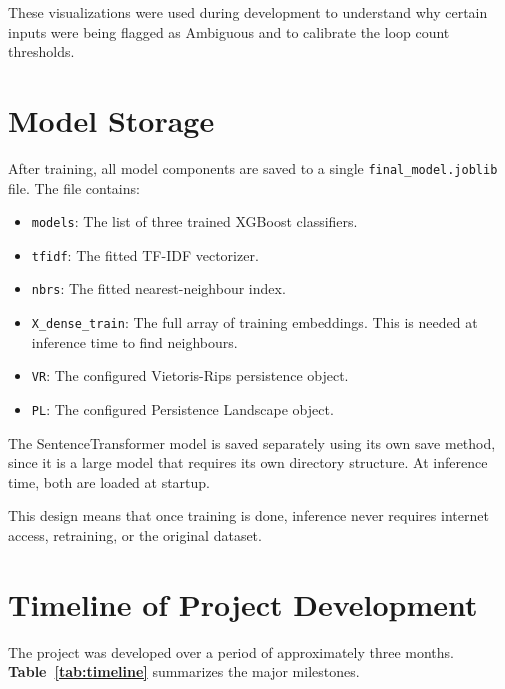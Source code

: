These visualizations were used during development to understand why certain inputs were being
flagged as Ambiguous and to calibrate the loop count thresholds.

\section{Model Storage}

After training, all model components are saved to a single \texttt{final\_model.joblib} file.
The file contains:

\begin{itemize}
    \item \texttt{models}: The list of three trained XGBoost classifiers.
    \item \texttt{tfidf}: The fitted TF-IDF vectorizer.
    \item \texttt{nbrs}: The fitted nearest-neighbour index.
    \item \texttt{X\_dense\_train}: The full array of training embeddings. This is needed at
    inference time to find neighbours.
    \item \texttt{VR}: The configured Vietoris-Rips persistence object.
    \item \texttt{PL}: The configured Persistence Landscape object.
\end{itemize}

The SentenceTransformer model is saved separately using its own save method, since it is a
large model that requires its own directory structure. At inference time, both are loaded at
startup.

This design means that once training is done, inference never requires internet access,
retraining, or the original dataset.

\section{Timeline of Project Development}

The project was developed over a period of approximately three months. \textbf{Table~\ref{tab:timeline}}
summarizes the major milestones.

